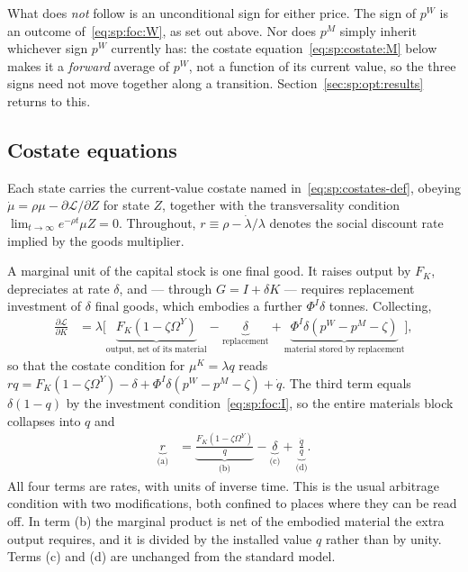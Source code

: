 What does \emph{not} follow is an unconditional sign for either price. The sign of $p^W$ is an outcome of~\eqref{eq:sp:foc:W}, as set out above. Nor does $p^M$ simply inherit whichever sign $p^W$ currently has: the costate equation~\eqref{eq:sp:costate:M} below makes it a \emph{forward} average of $p^W$, not a function of its current value, so the three signs need not move together along a transition. Section~\ref{sec:sp:opt:results} returns to this.

\subsection{Costate equations}\label{sec:app:sp:costates}

Each state carries the current-value costate named in~\eqref{eq:sp:costates-def}, obeying $\dot\mu=\rho\mu-\partial\mathcal L/\partial Z$ for state $Z$, together with the transversality condition $\lim_{t\to\infty}e^{-\rho t}\mu Z=0$. Throughout, $r\equiv\rho-\dot\lambda/\lambda$ denotes the social discount rate implied by the goods multiplier.

 A marginal unit of the capital stock is one final good. It raises output by $F_K$, depreciates at rate $\delta$, and --- through $G=I+\delta K$ --- requires replacement investment of $\delta$ final goods, which embodies a further $\Phi^I\delta$ tonnes. Collecting,
\begin{align*}
\frac{\partial\mathcal L}{\partial K} &= \lambda\Big[\underbrace{F_K\left(1-\zeta\Omega^Y\right)}_{\text{output, net of its material}}-\underbrace{\delta}_{\text{replacement}}+\underbrace{\Phi^I\delta\left(p^W-p^M-\zeta\right)}_{\text{material stored by replacement}}\Big],
\end{align*}
so that the costate condition for $\mu^K=\lambda q$ reads $rq=F_K\left(1-\zeta\Omega^Y\right)-\delta+\Phi^I\delta\left(p^W-p^M-\zeta\right)+\dot q$. The third term equals $\delta\left(1-q\right)$ by the investment condition~\eqref{eq:sp:foc:I}, so the entire materials block collapses into $q$ and
\begin{align}
\underbrace{r}_{\text{(a)}} &= \underbrace{\frac{F_K\left(1-\zeta\Omega^Y\right)}{q}}_{\text{(b)}}-\underbrace{\delta}_{\text{(c)}}+\underbrace{\frac{\dot q}{q}}_{\text{(d)}} .
\label{eq:sp:costate:K}
\end{align}
All four terms are rates, with units of inverse time. This is the usual arbitrage condition with two modifications, both confined to places where they can be read off. In term (b) the marginal product is net of the embodied material the extra output requires, and it is divided by the installed value $q$ rather than by unity. Terms (c) and (d) are unchanged from the standard model.

